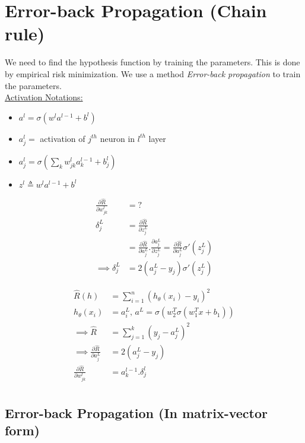 \documentclass[11pt]{article}
\begin{document}
\section{Error-back Propagation (Chain rule)}
\label{sec:error-back-prop}

We need to find the hypothesis function by training the parameters. This is done by empirical risk minimization. We use a method \textit{Error-back propagation} to train the parameters.\\

\underline{Activation Notations:}
\begin{itemize}
\item $a^l = \sigma \left( w^l a^{l-1} + b^l \right)$
\item $a^l_j =$ activation of $j^{th}$ neuron in $l^{th}$ layer
\item $a^l_j = \sigma \left( \sum_k w_{jk}^l a_k^{l-1} + b_j^l \right)$
\item $z^l \triangleq w^la^{l-1} + b^l$
\end{itemize}

\begin{align*}
  \frac{\partial \hat{R}}{\partial w^l_{jk}} &= ? \\
  \delta_j^L &= \frac{\partial \hat{R}}{\partial z_j^L} \\
  &= \frac{\partial \hat{R}}{\partial a_j^L} . \frac{\partial a_j^L}{\partial z_j^L} = \frac{\partial \hat{R}}{\partial a_j^L} \sigma' (z_j^L) \\
  \implies \delta_j^L &= 2 (a_j^L - y_j) \sigma' (z_j^L)
\end{align*}

\begin{align*}
  \hat{R}(h) &= \sum_{i=1}^n \left( h_{\theta}(x_i) - y_i \right)^2 \\
  h_{\theta}(x_i) &= a_i^L, \, a^L = \sigma \left( w^T_2 \sigma \left( w_1^Tx + b_1 \right) \right) \\
  \implies \hat{R} &= \sum_{j=1}^k \left( y_j - a_j^L \right)^2 \\
  \implies \frac{\partial \hat{R}}{\partial a_j^L} &= 2 \left( a_j^L - y_j \right)\\
  \frac{\partial \hat{R}}{\partial w^l_{jk}} &= a_k^{l-1} . \delta_j^l \\
\end{align*}


\subsection{Error-back Propagation (In matrix-vector form)}
\end{document}
